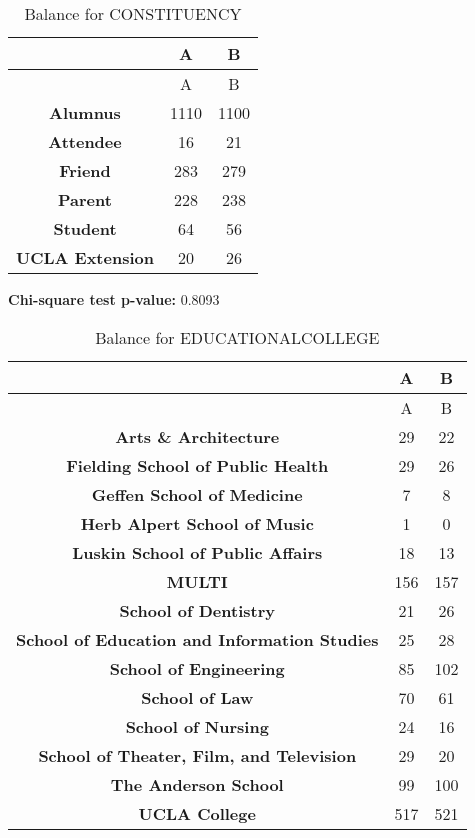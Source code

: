 \documentclass[
]{article}
\begin{document}
\begin{longtable}[]{@{}ccc@{}}
\caption{Balance for CONSTITUENCY}\tabularnewline
\toprule\noalign{}
~ & A & B \\
\midrule\noalign{}
\endfirsthead
\toprule\noalign{}
~ & A & B \\
\midrule\noalign{}
\endhead
\bottomrule\noalign{}
\endlastfoot
\textbf{Alumnus} & 1110 & 1100 \\
\textbf{Attendee} & 16 & 21 \\
\textbf{Friend} & 283 & 279 \\
\textbf{Parent} & 228 & 238 \\
\textbf{Student} & 64 & 56 \\
\textbf{UCLA Extension} & 20 & 26 \\
\end{longtable}

\textbf{Chi-square test p-value:} 0.8093\\
\pagebreak

\begin{longtable}[]{@{}ccc@{}}
\caption{Balance for EDUCATIONALCOLLEGE}\tabularnewline
\toprule\noalign{}
~ & A & B \\
\midrule\noalign{}
\endfirsthead
\toprule\noalign{}
~ & A & B \\
\midrule\noalign{}
\endhead
\bottomrule\noalign{}
\endlastfoot
\textbf{Arts \& Architecture} & 29 & 22 \\
\textbf{Fielding School of Public Health} & 29 & 26 \\
\textbf{Geffen School of Medicine} & 7 & 8 \\
\textbf{Herb Alpert School of Music} & 1 & 0 \\
\textbf{Luskin School of Public Affairs} & 18 & 13 \\
\textbf{MULTI} & 156 & 157 \\
\textbf{School of Dentistry} & 21 & 26 \\
\textbf{School of Education and Information Studies} & 25 & 28 \\
\textbf{School of Engineering} & 85 & 102 \\
\textbf{School of Law} & 70 & 61 \\
\textbf{School of Nursing} & 24 & 16 \\
\textbf{School of Theater, Film, and Television} & 29 & 20 \\
\textbf{The Anderson School} & 99 & 100 \\
\textbf{UCLA College} & 517 & 521 \\
\end{longtable}
\end{document}

